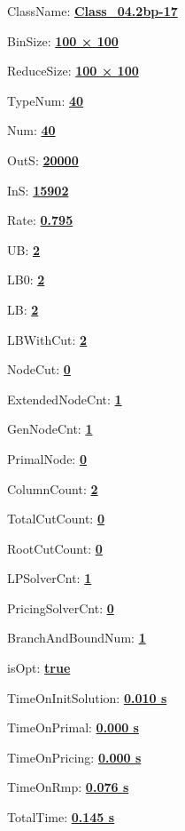 \documentclass[11pt]{article}
\begin{document}
\pagestyle{empty}


ClassName: \underline{\textbf{Class_04.2bp-17}}
\par
BinSize: \underline{\textbf{100 × 100}}
\par
ReduceSize: \underline{\textbf{100 × 100}}
\par
TypeNum: \underline{\textbf{40}}
\par
Num: \underline{\textbf{40}}
\par
OutS: \underline{\textbf{20000}}
\par
InS: \underline{\textbf{15902}}
\par
Rate: \underline{\textbf{0.795}}
\par
UB: \underline{\textbf{2}}
\par
LB0: \underline{\textbf{2}}
\par
LB: \underline{\textbf{2}}
\par
LBWithCut: \underline{\textbf{2}}
\par
NodeCut: \underline{\textbf{0}}
\par
ExtendedNodeCnt: \underline{\textbf{1}}
\par
GenNodeCnt: \underline{\textbf{1}}
\par
PrimalNode: \underline{\textbf{0}}
\par
ColumnCount: \underline{\textbf{2}}
\par
TotalCutCount: \underline{\textbf{0}}
\par
RootCutCount: \underline{\textbf{0}}
\par
LPSolverCnt: \underline{\textbf{1}}
\par
PricingSolverCnt: \underline{\textbf{0}}
\par
BranchAndBoundNum: \underline{\textbf{1}}
\par
isOpt: \underline{\textbf{true}}
\par
TimeOnInitSolution: \underline{\textbf{0.010 s}}
\par
TimeOnPrimal: \underline{\textbf{0.000 s}}
\par
TimeOnPricing: \underline{\textbf{0.000 s}}
\par
TimeOnRmp: \underline{\textbf{0.076 s}}
\par
TotalTime: \underline{\textbf{0.145 s}}
\par
\newpage
\end{document}
